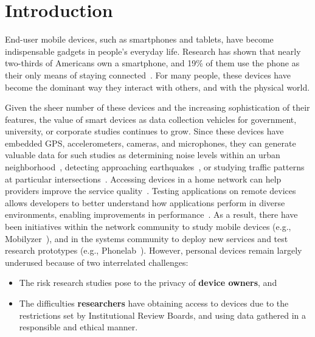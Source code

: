 \section{Introduction}

End-user mobile devices, such as smartphones and tablets, have become
indispensable gadgets in people's everyday life. %
Research has shown that nearly two-thirds of
Americans own a smartphone, and 19\% of them
use the phone as their only means of staying connected~\cite{phone2015}. 
For many people, these devices have become the dominant way they
interact with others, and with the physical world.

Given the sheer number of these devices and the increasing
sophistication of their features,
the value of smart devices as data collection vehicles for government,
university, or corporate studies continues to grow. Since
these devices have embedded GPS,
accelerometers, cameras, and microphones, they can generate valuable
data for such studies as determining noise levels within an urban
neighborhood~\cite{kardous2014evaluation}, detecting approaching 
earthquakes~\cite{faulkner2011next}, or studying traffic
patterns at particular intersections~\cite{zhuang2011time}. Accessing 
devices in a home network can help providers improve the service 
quality~\cite{sundaresan2011broadband}. Testing applications on remote
devices allows developers to better understand how applications 
perform in diverse environments, enabling improvements in 
performance~\cite{ravindranath2012appinsight}. 
%
As a result, there have been initiatives within the network
community to study mobile devices (e.g.,
Mobilyzer~\cite{nikravesh2015mobilyzer}), and in the systems community
to deploy new services and test research prototypes (e.g.,
Phonelab~\cite{phonelab, nandugudi2013phonelab}). However, personal devices
remain largely underused because of two interrelated challenges:

\begin{itemize}\setlength\itemsep{0em}
\item The risk research studies pose to the privacy of \textbf{device 
owners}, and 

\item The difficulties \textbf{researchers} have
obtaining access to devices due to the restrictions set by Institutional Review 
Boards, and using data gathered in a responsible and ethical manner. 
\end{itemize}
					
